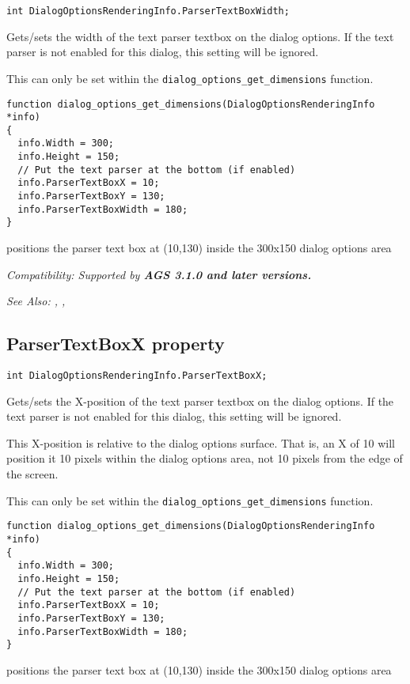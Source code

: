 \begin{verbatim}
int DialogOptionsRenderingInfo.ParserTextBoxWidth;
\end{verbatim}
Gets/sets the width of the text parser textbox on the dialog options.
If the text parser is not enabled for this dialog, this setting will be ignored.

This can only be set within the \verb$dialog_options_get_dimensions$ function.

\begin{verbatim}
function dialog_options_get_dimensions(DialogOptionsRenderingInfo *info)
{
  info.Width = 300;
  info.Height = 150;
  // Put the text parser at the bottom (if enabled)
  info.ParserTextBoxX = 10;
  info.ParserTextBoxY = 130;
  info.ParserTextBoxWidth = 180;
}
\end{verbatim}
positions the parser text box at (10,130) inside the 300x150 dialog options area

\it{Compatibility:} Supported by \bf{AGS 3.1.0} and later versions.

\it{See Also:} ,
,


\subsection{ParserTextBoxX property}\label{DialogOptionsRenderingInfo.ParserTextBoxX}%

\begin{verbatim}
int DialogOptionsRenderingInfo.ParserTextBoxX;
\end{verbatim}
Gets/sets the X-position of the text parser textbox on the dialog options.
If the text parser is not enabled for this dialog, this setting will be ignored.

This X-position is relative to the dialog options surface. That is, an X of 10
will position it 10 pixels within the dialog options area, not 10 pixels from
the edge of the screen.

This can only be set within the \verb$dialog_options_get_dimensions$ function.

\begin{verbatim}
function dialog_options_get_dimensions(DialogOptionsRenderingInfo *info)
{
  info.Width = 300;
  info.Height = 150;
  // Put the text parser at the bottom (if enabled)
  info.ParserTextBoxX = 10;
  info.ParserTextBoxY = 130;
  info.ParserTextBoxWidth = 180;
}
\end{verbatim}
positions the parser text box at (10,130) inside the 300x150 dialog options area

